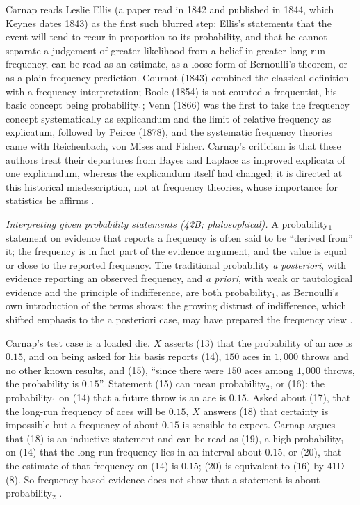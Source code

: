 Carnap reads Leslie Ellis (a paper read in 1842 and published in 1844,
which Keynes dates 1843) as the first such blurred step: Ellis's
statements that the event will tend to recur in proportion to its
probability, and that he cannot separate a judgement of greater
likelihood from a belief in greater long-run frequency, can be read as
an estimate, as a loose form of Bernoulli's theorem, or as a plain
frequency prediction. Cournot (1843) combined the classical definition
with a frequency interpretation; Boole (1854) is not counted a
frequentist, his basic concept being probability\(_1\); Venn (1866) was
the first to take the frequency concept systematically as explicandum
and the limit of relative frequency as explicatum, followed by Peirce
(1878), and the systematic frequency theories came with Reichenbach,
von Mises and Fisher. Carnap's criticism is that these authors treat
their departures from Bayes and Laplace as improved explicata of one
explicandum, whereas the explicandum itself had changed; it is directed
at this historical misdescription, not at frequency theories, whose
importance for statistics he affirms
\cite[sec.~42A, pp.~185--187]{Carnap1950Probability}.

\emph{Interpreting given probability statements (42B; philosophical).}
A probability\(_1\) statement on evidence that reports a frequency
is often said to be ``derived from'' it; the frequency is in fact
part of the evidence argument, and the value is equal or close to the
reported frequency. The traditional probability \emph{a posteriori},
with evidence reporting an observed frequency, and \emph{a priori},
with weak or tautological evidence and the principle of indifference,
are both probability\(_1\), as Bernoulli's own introduction of the
terms shows; the growing distrust of indifference, which shifted
emphasis to the a posteriori case, may have prepared the frequency
view \cite[sec.~42B, pp.~187--189]{Carnap1950Probability}.

Carnap's test case is a loaded die. \(X\) asserts (13) that the
probability of an ace is \(0.15\), and on being asked for his basis
reports (14), \(150\) aces in \(1{,}000\) throws and no other known
results, and (15), ``since there were \(150\) aces among \(1{,}000\)
throws, the probability is \(0.15\)''. Statement (15) can mean
probability\(_2\), or (16): the probability\(_1\) on (14) that a
future throw is an ace is \(0.15\). Asked about (17), that the
long-run frequency of aces will be \(0.15\), \(X\) answers (18) that
certainty is impossible but a frequency of about \(0.15\) is sensible to
expect. Carnap argues that (18) is an inductive statement and can be read
as (19), a high probability\(_1\) on (14) that the long-run frequency
lies in an interval about \(0.15\), or (20), that the estimate of that
frequency on (14) is \(0.15\); (20) is equivalent to (16) by 41D (8).
So frequency-based evidence does not show that a statement is about
probability\(_2\) \cite[sec.~42B, pp.~189--191]{Carnap1950Probability}.

